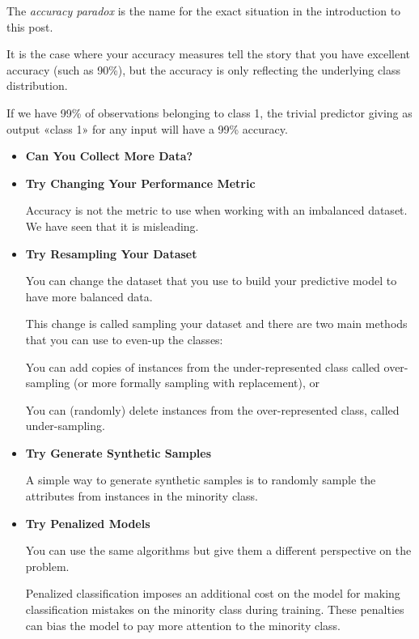 The \textit{accuracy paradox} is the name for the exact situation in the introduction to this post.

It is the case where your accuracy measures tell the story that you have excellent accuracy (such as 90\%), but the accuracy is only reflecting the underlying class distribution.

If we have 99\% of observations belonging to class 1, the trivial predictor giving as output «class 1» for any input will have a 99\% accuracy.

\begin{itemize}
    \item \textbf{Can You Collect More Data?}
    \item \textbf{Try Changing Your Performance Metric}
          
          Accuracy is not the metric to use when working with an imbalanced dataset. We have seen that it is misleading.
    \item \textbf{Try Resampling Your Dataset}
          
          You can change the dataset that you use to build your predictive model to have more balanced data.
          
          This change is called sampling your dataset and there are two main methods that you can use to even-up the classes:
          
          You can add copies of instances from the under-represented class called over-sampling (or more formally sampling with replacement), or
          
          You can (randomly) delete instances from the over-represented class, called under-sampling.
    \item \textbf{Try Generate Synthetic Samples}
          
          A simple way to generate synthetic samples is to randomly sample the attributes from instances in the minority class.
    \item \textbf{Try Penalized Models}
          
          You can use the same algorithms but give them a different perspective on the problem.
          
          Penalized classification imposes an additional cost on the model for making classification mistakes on the minority class during training. These penalties can bias the model to pay more attention to the minority class.
\end{itemize}

